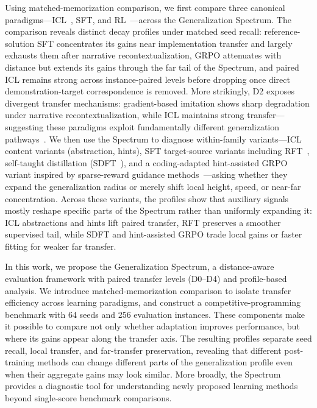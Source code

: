 \documentclass[]{bytedance_seed}
\theoremstyle{plain}
\theoremstyle{definition}
\theoremstyle{remark}
\begin{document}
Using matched-memorization comparison, we first compare three canonical paradigms---ICL~\citep{brown2020language, dong2024survey}, SFT, and RL~\citep{ouyang2022training, shao2024grpo}---across the Generalization Spectrum. The comparison reveals distinct decay profiles under matched seed recall: reference-solution SFT concentrates its gains near implementation transfer and largely exhausts them after narrative recontextualization, GRPO attenuates with distance but extends its gains through the far tail of the Spectrum, and paired ICL remains strong across instance-paired levels before dropping once direct demonstration-target correspondence is removed. More strikingly, D2 exposes divergent transfer mechanisms: gradient-based imitation shows sharp degradation under narrative recontextualization, while ICL maintains strong transfer---suggesting these paradigms exploit fundamentally different generalization pathways~\citep{mosbach2023fewshot}. We then use the Spectrum to diagnose within-family variants---ICL content variants (abstraction, hints), SFT target-source variants including RFT~\citep{yuan2023rft}, self-taught distillation (SDFT~\citep{sdft2026,opsd2026,sdpo2026}), and a coding-adapted hint-assisted GRPO variant inspired by sparse-reward guidance methods~\citep{li2026questa,ghpo2025,zhang2026bread,zhang2025stephint,wang2026hint,huang2025hintgrpo,kang2025table}---asking whether they expand the generalization radius or merely shift local height, speed, or near-far concentration. Across these variants, the profiles show that auxiliary signals mostly reshape specific parts of the Spectrum rather than uniformly expanding it: ICL abstractions and hints lift paired transfer, RFT preserves a smoother supervised tail, while SDFT and hint-assisted GRPO trade local gains or faster fitting for weaker far transfer.

In this work, we propose the Generalization Spectrum, a distance-aware evaluation framework with paired transfer levels (D0--D4) and profile-based analysis. We introduce matched-memorization comparison to isolate transfer efficiency across learning paradigms, and construct a competitive-programming benchmark with 64 seeds and 256 evaluation instances. These components make it possible to compare not only whether adaptation improves performance, but where its gains appear along the transfer axis. The resulting profiles separate seed recall, local transfer, and far-transfer preservation, revealing that different post-training methods can change different parts of the generalization profile even when their aggregate gains may look similar. More broadly, the Spectrum provides a diagnostic tool for understanding newly proposed learning methods beyond single-score benchmark comparisons.
\end{document}
